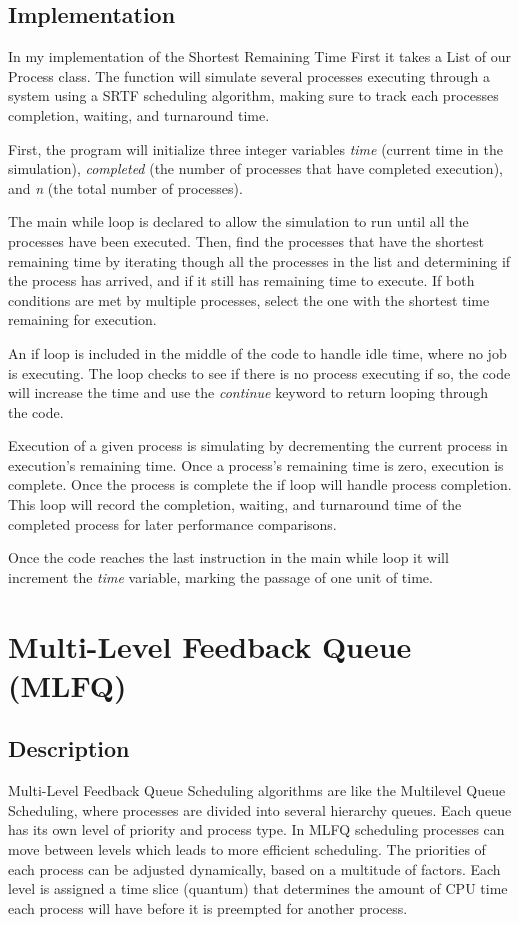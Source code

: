 \documentclass[11pt]{article}
\begin{document}
\subsection{Implementation}


In my implementation of the Shortest Remaining Time First it takes a List of our Process class. The function will simulate several processes executing through a system using a SRTF scheduling algorithm, making sure to track each processes completion, waiting, and turnaround time.

First, the program will initialize three integer variables \textit{time} (current time in the simulation), \textit{completed} (the number of processes that have completed execution), and \textit{n} (the total number of processes).

The main while loop is declared to allow the simulation to run until all the processes have been executed. Then, find the processes that have the shortest remaining time by iterating though all the processes in the list and determining if the process has arrived, and if it still has remaining time to execute. If both conditions are met by multiple processes, select the one with the shortest time remaining for execution.

An if loop is included in the middle of the code to handle idle time, where no job is executing. The loop checks to see if there is no process executing if so, the code will increase the time and use the \textit{continue} keyword to return looping through the code.

Execution of a given process is simulating by decrementing the current process in execution's remaining time. Once a process's remaining time is zero, execution is complete. Once the process is complete the if loop will handle process completion. This loop will record the completion, waiting, and turnaround time of the completed process for later performance comparisons.

Once the code reaches the last instruction in the main while loop it will increment the \textit{time} variable, marking the passage of one unit of time.


\section{Multi-Level Feedback Queue (MLFQ)}
\subsection{Description}
Multi-Level Feedback Queue Scheduling algorithms are like the Multilevel Queue Scheduling, where processes are divided into several hierarchy queues. Each queue has its own level of priority and process type. In MLFQ scheduling processes can move between levels which leads to more efficient scheduling. The priorities of each process can be adjusted dynamically, based on a multitude of factors. Each level is assigned a time slice (quantum) that determines the amount of CPU time each process will have before it is preempted for another process.
\end{document}
